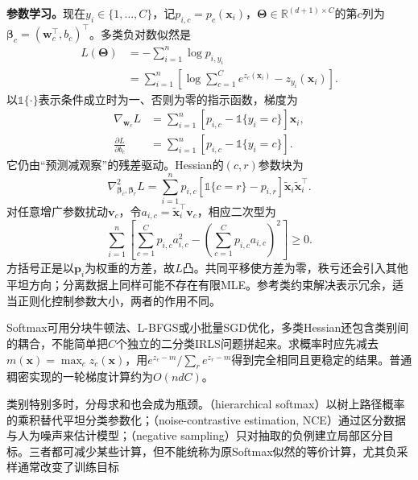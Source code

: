 \textbf{参数学习。}现在$y_i\in\{1,\ldots,C\}$，记$p_{i,c}=p_c(\bm{x}_i)$，$\bm{\Theta}\in\mathbb{R}^{(d+1)\times C}$的第$c$列为$\bm{\beta}_c=(\bm{w}_c^{\top},b_c)^{\top}$。多类负对数似然是
\begin{equation}
  \label{eq:classification-softmax-loss}
  \begin{aligned}
    L(\bm{\Theta})
      &=-\sum_{i=1}^{n}\log p_{i,y_i}\\
      &=\sum_{i=1}^{n}\left[
        \log\sum_{c=1}^{C}e^{z_c(\bm{x}_i)}
        -z_{y_i}(\bm{x}_i)\right].
  \end{aligned}
\end{equation}
以$\mathbb{1}\{\cdot\}$表示条件成立时为一、否则为零的指示函数，梯度为
\begin{equation}
  \label{eq:classification-softmax-gradient}
  \begin{aligned}
    \nabla_{\bm{w}_c}L
      &=\sum_{i=1}^{n}
        [p_{i,c}-\mathbb{1}\{y_i=c\}]\bm{x}_i,\\
    \frac{\partial L}{\partial b_c}
      &=\sum_{i=1}^{n}
        [p_{i,c}-\mathbb{1}\{y_i=c\}].
  \end{aligned}
\end{equation}
它仍由“预测减观察”的残差驱动。Hessian的$(c,r)$参数块为
\[
  \nabla^2_{\bm{\beta}_c,\bm{\beta}_r}L
  =\sum_{i=1}^{n}p_{i,c}
    [\mathbb{1}\{c=r\}-p_{i,r}]
    \tilde{\bm{x}}_i\tilde{\bm{x}}_i^{\top}.
\]
对任意增广参数扰动$\bm{v}_c$，令$a_{i,c}=\tilde{\bm{x}}_i^{\top}\bm{v}_c$，相应二次型为
\[
  \sum_{i=1}^{n}\left[
    \sum_{c=1}^{C}p_{i,c}a_{i,c}^2
    -\left(\sum_{c=1}^{C}p_{i,c}a_{i,c}\right)^2
  \right]\geq0.
\]
方括号正是以$\bm{p}_i$为权重的方差，故$L$凸。共同平移使方差为零，秩亏还会引入其他平坦方向；分离数据上同样可能不存在有限MLE。参考类约束解决表示冗余，适当正则化控制参数大小，两者的作用不同。

Softmax可用分块牛顿法、L-BFGS或小批量SGD优化，多类Hessian还包含类别间的耦合，不能简单把$C$个独立的二分类IRLS问题拼起来。求概率时应先减去$m(\bm{x})=\max_c z_c(\bm{x})$，用$e^{z_c-m}/\sum_r e^{z_r-m}$得到完全相同且更稳定的结果。普通稠密实现的一轮梯度计算约为$O(ndC)$。

类别特别多时，分母求和也会成为瓶颈。（hierarchical softmax）以树上路径概率的乘积替代平坦分类参数化；（noise-contrastive estimation, NCE）通过区分数据与人为噪声来估计模型；（negative sampling）只对抽取的负例建立局部区分目标。三者都可减少某些计算，但不能统称为原Softmax似然的等价计算，尤其负采样通常改变了训练目标

